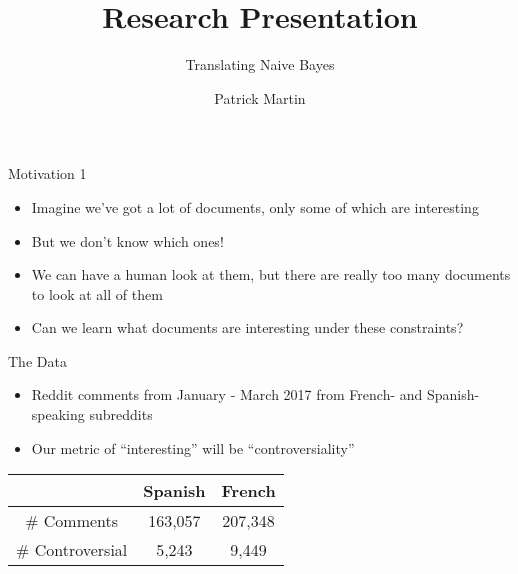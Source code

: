 \documentclass{beamer}
\title %
{Research Presentation}
\subtitle
{Translating Naive Bayes} %
\author %
{Patrick Martin}
\begin{document}
\begin{frame}
  \titlepage
\end{frame}




\begin{frame}{Motivation 1}

  \begin{itemize}
  \item Imagine we've got a lot of documents, only some of which are interesting
  \item But we don't know which ones!
  \item We can have a human look at them, but there are really too many documents to look at all of them
  \item Can we learn what documents are interesting under these constraints?

  \end{itemize}
\end{frame}

\begin{frame}{The Data}
\begin{itemize}
\item Reddit comments from January - March 2017 from French- and Spanish-speaking subreddits
\item Our metric of ``interesting'' will be ``controversiality''
\end{itemize}
\begin{center}
\begin{tabular}{c|c|c}
& Spanish & French \\\hline
\# Comments & 163,057 & 207,348 \\
\# Controversial & 5,243 & 9,449 \end{tabular}\end{center}
\end{frame}
\end{document}
